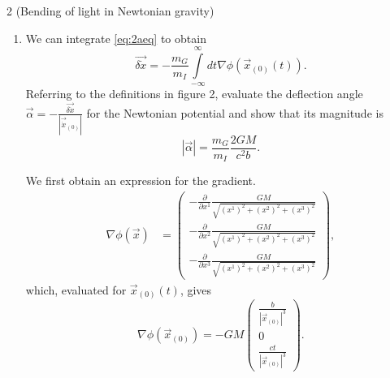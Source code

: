 \documentclass[11pt]{article}
\begin{document}
\begin{problem}{2 (Bending of light in Newtonian gravity)}
\begin{enumerate}[label=(\alph*)]
\begin{answer}
			      Moreover, since \( \vec{\delta x} \sim \phi \), we have that \( \vec{\delta x}\phi^{\prime} \sim \mathcal{O}(\vec{\delta x}^2) \), and therefore we have, to first order,
			      \begin{equation}
				      \label{eq:42}
				      m_I \ddot{\vec{\delta x}} = -m_G \nabla \phi(\vec{x}_{(0)}).
			      \end{equation}
		      \end{answer}

		\item We can integrate \cref{eq:2aeq} to obtain
		      \begin{equation}
			      \label{eq:13}
			      \vec{\delta \dot{x}} = - \frac{m_{G}}{m_{I}} \int\limits_{-\infty}^{\infty} dt \nabla \phi(\vec{x}_{(0)}(t)).
		      \end{equation}
		      Referring to the definitions in figure 2, evaluate the deflection angle \(\vec{\alpha} = - \frac{\vec{\delta \dot{x}}}{\left| \vec{\dot{x}}_{(0)} \right|}\) for the Newtonian potential and show that its magnitude is
		      \begin{equation}
			      \label{eq:14}
			      \left| \vec{\alpha} \right| = \frac{m_G}{m_I} \frac{2GM}{c^2 b}.
		      \end{equation}
		      \begin{answer}
			      We first obtain an expression for the gradient.
			      \begin{align}
				      \label{eq:45}
				      \nabla \phi(\vec{x}) & = \begin{pmatrix}
					                               -\frac{\partial }{\partial  x^{1}} \frac{GM}{\sqrt{(x^{1})^2 + (x^2)^2 + (x^3)^2}} \\ -\frac{\partial }{\partial  x^{2}} \frac{GM}{\sqrt{(x^{1})^2 + (x^2)^2 + (x^3)^2}} \\ - \frac{\partial }{\partial x^3} \frac{GM}{\sqrt{(x^{1})^2 + (x^2)^2 + (x^3)^2}}
				                               \end{pmatrix},
			      \end{align}
			      which, evaluated for \( \vec{x}_{(0)}(t) \), gives
			      \begin{equation}
				      \label{eq:46}
				      \nabla \phi(\vec{x}_{(0)}) = -GM \begin{pmatrix}
					      \frac{b}{|\vec{x}_{(0)}|^3} \\
					      0                           \\
					      \frac{ct}{|\vec{x}_{(0)}|^3}
				      \end{pmatrix}.

\end{equation}
\end{answer}
\end{enumerate}
\end{problem}
\end{document}
